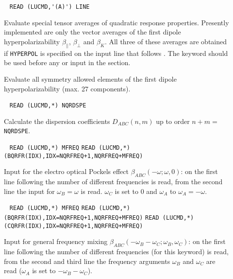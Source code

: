\begin{description}
\item[] \verb| |\newline
   \verb|READ (LUCMD,'(A)') LINE|

   Evaluate special tensor averages of quadratic response properties.
   Presently implemented are only the vector averages of the first
   dipole hyperpolarizability $\beta_{||}$, $\beta_{\bot}$ and 
   $\beta_K$. All three of these averages are obtained if 
   \verb+HYPERPOL+ is specified on the input line that follows
   .
   The  keyword should be used before any  
   or  input in the  section.
 
\item[] 
Evaluate all symmetry allowed elements of the first
dipole hyperpolarizability (max. 27 components).
 
\item[]  \verb| |\newline
   \verb|READ (LUCMD,*) NQRDSPE|

   Calculate the dispersion coefficients
   $D_{ABC}(n,m)$ up to order $n+m =$\verb+NQRDSPE+. 
 

\item[]  \verb| |\newline
   \verb|READ (LUCMD,*) MFREQ|\newline
   \verb|READ (LUCMD,*) (BQRFR(IDX),IDX=NQRFREQ+1,NQRFREQ+MFREQ)|

   Input for the electro optical Pockels effect
   $\beta_{ABC}(-\omega;\omega,0)$:
   on the first line following  the number of different
   frequencies is read, from the second line the input for 
   $\omega_B = \omega$ is read. $\omega_C$ is set to $0$ and
   $\omega_A$ to $\omega_A = -\omega$.

\item[]  \verb| |\newline
   \verb|READ (LUCMD,*) MFREQ|\newline
   \verb|READ (LUCMD,*) (BQRFR(IDX),IDX=NQRFREQ+1,NQRFREQ+MFREQ)|\newline
   \verb|READ (LUCMD,*) (CQRFR(IDX),IDX=NQRFREQ+1,NQRFREQ+MFREQ)|

   Input for general frequency mixing 
   $\beta_{ABC}(-\omega_B-\omega_C;\omega_B,\omega_C)$: on the first line 
   following  the number of different frequencies
   (for this keyword) is read, from the second and third line
   the frequency arguments $\omega_B$ and $\omega_C$ are read
   ($\omega_A$ is set to $-\omega_B-\omega_C$).


\end{description}
